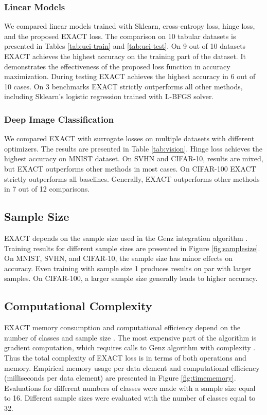 \documentclass[nohyperref]{article}
\theoremstyle{plain}
\theoremstyle{definition}
\theoremstyle{remark}
\begin{document}
\subsubsection{Linear Models}
We compared linear models trained with Sklearn, cross-entropy loss, hinge loss, and the proposed EXACT loss. The comparison on 10 tabular datasets is presented in Tables \ref{tab:uci-train} and \ref{tab:uci-test}. On 9 out of 10 datasets EXACT achieves the highest accuracy on the training part of the dataset. It demonstrates the effectiveness of the proposed loss function in accuracy maximization. During testing \mbox{EXACT} achieves the highest accuracy in 6 out of 10 cases. On 3 benchmarks EXACT strictly outperforms all other methods, including Sklearn's logistic regression trained with L-BFGS solver. 

\subsubsection{Deep Image Classification}
We compared EXACT with surrogate losses on multiple datasets with different optimizers. The results are presented in Table \ref{tab:vision}. Hinge loss achieves the highest accuracy on MNIST dataset. On SVHN and CIFAR-10, results are mixed, but EXACT outperforms other methods in most cases. On CIFAR-100 EXACT strictly outperforms all baselines. Generally, EXACT outperforms other methods in 7 out of 12 comparisons.





\subsection{Sample Size}
EXACT depends on the sample size used in the Genz integration algorithm \cite{genz1992numerical}. Training results for different sample sizes are presented in Figure \ref{fig:samplesize}. On MNIST, SVHN, and CIFAR-10, the sample size has minor effects on accuracy. Even training with sample size 1 produces results on par with larger samples. On CIFAR-100, a larger sample size generally leads to higher accuracy.

\subsection{Computational Complexity}
EXACT memory consumption and computational efficiency depend on the number of classes  and sample size . The most expensive part of the algorithm is gradient computation, which requires  calls to Genz algorithm with complexity . Thus the total complexity of EXACT loss is  in terms of both operations and memory. Empirical memory usage per data element and computational efficiency (milliseconds per data element) are presented in Figure \ref{fig:timememory}. Evaluations for different numbers of classes were made with a sample size equal to 16. Different sample sizes were evaluated with the number of classes equal to 32.
\end{document}
